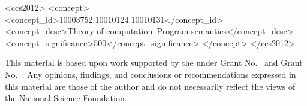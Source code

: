 \documentclass[acmsmall,review,anonymous]{acmart}\settopmatter{printfolios=true,printccs=false,printacmref=false}
\begin{document}
\begin{CCSXML}
<ccs2012>
  <concept>
    <concept_id>10003752.10010124.10010131</concept_id>
    <concept_desc>Theory of computation~Program semantics</concept_desc>
    <concept_significance>500</concept_significance>
  </concept>
</ccs2012>
\end{CCSXML}





\maketitle




% 
% 
% 
% 





\begin{acks}                            %
  This material is based upon work supported by the
   under Grant
  No.~ and Grant
  No.~.  Any opinions, findings, and
  conclusions or recommendations expressed in this material are those
  of the author and do not necessarily reflect the views of the
  National Science Foundation.
\end{acks}






\end{document}

